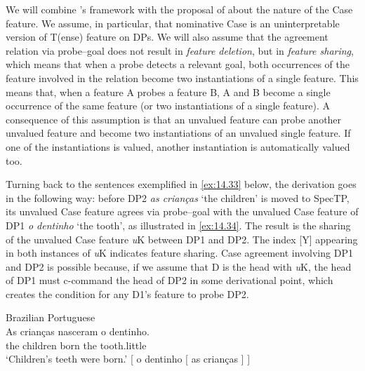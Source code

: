 \documentclass[output=paper]{langsci/langscibook}
\begin{document}
We will combine \citet{Chomsky2008}’s framework with the proposal of
\citet{PesTor2004} about the nature of the Case feature. We assume, in
particular, that nominative Case is an uninterpretable
version of T(ense) feature on DPs. We will also assume that the agreement
relation via probe--goal does not result in \emph{feature deletion}, but in
\emph{feature sharing}, which means that when a probe detects a relevant goal,
both occurrences of the feature involved in the relation become two
instantiations of a single feature.  This means that, when a feature A probes a
feature B, A and B become a single occurrence of the same feature (or two
instantiations of a single feature). A consequence of this assumption is that
an unvalued feature can probe another unvalued feature and become two
instantiations of an unvalued single feature.  If one of the instantiations is
valued, another instantiation is automatically valued too.

Turning back to the sentences exemplified in \eqref{ex:14.33} below, the
derivation goes in the following way: before DP2 \emph{as crianças} ‘the
children’ is moved to SpecTP, its unvalued Case feature agrees via probe--goal
with the unvalued Case feature of DP1 \emph{o dentinho} ‘the tooth’, as
illustrated in \eqref{ex:14.34}. The result is the sharing of the unvalued Case
feature \emph{u}K between DP1 and DP2. The index [Y] appearing in both
instances of \emph{u}K indicates feature sharing. Case agreement involving DP1
and DP2 is possible because, if we assume that D is the head with \emph{u}K,
the head of DP1 must c-command the head of DP2 in some derivational point,
which creates the condition for any D1’s feature to probe DP2.\largerpage[1]

\ea%
    \label{ex:14.33}Brazilian Portuguese\\
    \gll    As crianças nasceram o dentinho.\\
            the children born the tooth.little\\
    \glt    ‘Children’s teeth were born.’
\ex%
    \label{ex:14.34}
    {}[ o dentinho [ as crianças ] ]
\z
\end{document}
